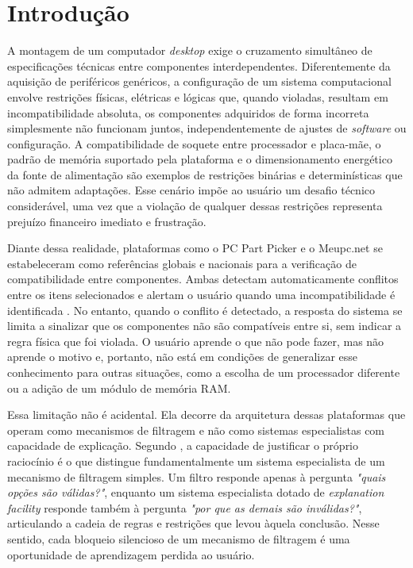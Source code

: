 \chapter{Introdução}
\label{cap:01}
A montagem de um computador \textit{desktop} exige o cruzamento simultâneo de especificações
técnicas entre componentes interdependentes. Diferentemente da aquisição de periféricos genéricos,
a configuração de um sistema computacional envolve restrições físicas, elétricas e lógicas que,
quando violadas, resultam em incompatibilidade absoluta, os componentes adquiridos de forma incorreta
simplesmente não funcionam juntos, independentemente de ajustes de \textit{software} ou configuração.
A compatibilidade de soquete entre processador e placa-mãe, o padrão de memória suportado pela plataforma
e o dimensionamento energético da fonte de alimentação são exemplos de restrições binárias e determinísticas
que não admitem adaptações. Esse cenário impõe ao usuário um desafio
técnico considerável, uma vez que a violação de qualquer dessas restrições representa prejuízo financeiro
imediato e frustração.

Diante dessa realidade, plataformas como o PC Part Picker e o Meupc.net se estabeleceram como referências
globais e nacionais para a verificação de compatibilidade entre componentes. Ambas detectam automaticamente
conflitos entre os itens selecionados e alertam o usuário quando uma incompatibilidade é identificada \cite{PCPARTPICKER2024,MEUPC2024}.
No entanto, quando o conflito é detectado, a resposta do sistema se limita a sinalizar que os componentes não são compatíveis entre si,
sem indicar a regra física que foi violada. O usuário aprende o que não pode fazer, mas não aprende o motivo
e, portanto, não está em condições de generalizar esse conhecimento para outras situações, como a escolha de
um processador diferente ou a adição de um módulo de memória RAM.

Essa limitação não é acidental. Ela decorre da arquitetura dessas plataformas que operam como mecanismos
de filtragem e não como sistemas especialistas com capacidade de explicação. Segundo \textcite{Clancey1983},
a capacidade de justificar o próprio raciocínio é o que distingue fundamentalmente um sistema especialista
de um mecanismo de filtragem simples. Um filtro responde apenas à pergunta \textit{"quais opções são válidas?"},
enquanto um sistema especialista dotado de \textit{explanation facility} responde também à pergunta \textit{"por que as
  demais são inválidas?"}, articulando a cadeia de regras e restrições que levou àquela conclusão. Nesse sentido,
cada bloqueio silencioso de um mecanismo de filtragem é uma oportunidade de aprendizagem perdida ao usuário.

